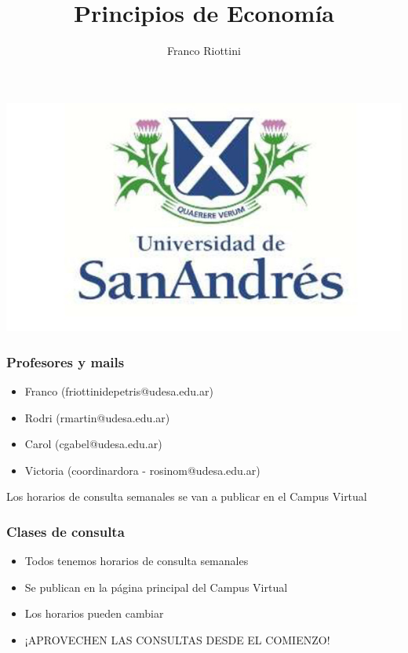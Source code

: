 \documentclass{beamer}
\title[Principios de Economía]{Principios de Economía}
\date{}
\author[Riottini]{Franco Riottini}
\institute[]{Universidad de San Andrés \\
2024}
\begin{document}
\begin{frame}

    \titlepage
    \centering
    \includegraphics[scale=0.25]{../Figures/logoUDESA.jpg} 

\end{frame}

\begin{frame}
\frametitle{Profesores y mails}
\begin{itemize}
    \item Franco (friottinidepetris@udesa.edu.ar)
    \item Rodri (rmartin@udesa.edu.ar)
    \item Carol (cgabel@udesa.edu.ar)
    \item Victoria (coordinardora - rosinom@udesa.edu.ar)
\end{itemize}
Los horarios de consulta semanales se van a publicar en el Campus Virtual
\end{frame}

\begin{frame}
    \frametitle{Clases de consulta}
    \begin{itemize}
        \item Todos tenemos horarios de consulta semanales \vspace{2mm}
        \item Se publican en la página principal del Campus Virtual \vspace{2mm}
        \item Los horarios pueden cambiar \vspace{2mm}
        \item ¡APROVECHEN LAS CONSULTAS DESDE EL COMIENZO!
    \end{itemize}
\end{frame}
\end{document}
